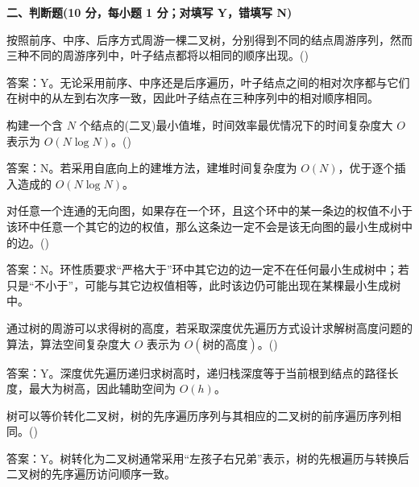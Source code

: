 \textbf{二、判断题(10 分，每小题 1 分；对填写 Y，错填写 N)}

\begin{question}
按照前序、中序、后序方式周游一棵二叉树，分别得到不同的结点周游序列，然而三种不同的周游序列中，叶子结点都将以相同的顺序出现。(\quad)
\begin{solution}
答案：Y。无论采用前序、中序还是后序遍历，叶子结点之间的相对次序都与它们在树中的从左到右次序一致，因此叶子结点在三种序列中的相对顺序相同。
\end{solution}
\end{question}

\begin{question}
构建一个含 $N$ 个结点的(二叉)最小值堆，时间效率最优情况下的时间复杂度大 $O$ 表示为 $O(N\log N)$。(\quad)
\begin{solution}
答案：N。若采用自底向上的建堆方法，建堆时间复杂度为 $O(N)$，优于逐个插入造成的 $O(N\log N)$。
\end{solution}
\end{question}

\begin{question}
对任意一个连通的无向图，如果存在一个环，且这个环中的某一条边的权值不小于该环中任意一个其它的边的权值，那么这条边一定不会是该无向图的最小生成树中的边。(\quad)
\begin{solution}
答案：N。环性质要求“严格大于”环中其它边的边一定不在任何最小生成树中；若只是“不小于”，可能与其它边权值相等，此时该边仍可能出现在某棵最小生成树中。
\end{solution}
\end{question}

\begin{question}
通过树的周游可以求得树的高度，若采取深度优先遍历方式设计求解树高度问题的算法，算法空间复杂度大 $O$ 表示为 $O(\text{树的高度})$。(\quad)
\begin{solution}
答案：Y。深度优先遍历递归求树高时，递归栈深度等于当前根到结点的路径长度，最大为树高，因此辅助空间为 $O(h)$。
\end{solution}
\end{question}

\begin{question}
树可以等价转化二叉树，树的先序遍历序列与其相应的二叉树的前序遍历序列相同。(\quad)
\begin{solution}
答案：Y。树转化为二叉树通常采用“左孩子右兄弟”表示，树的先根遍历与转换后二叉树的先序遍历访问顺序一致。
\end{solution}
\end{question}

